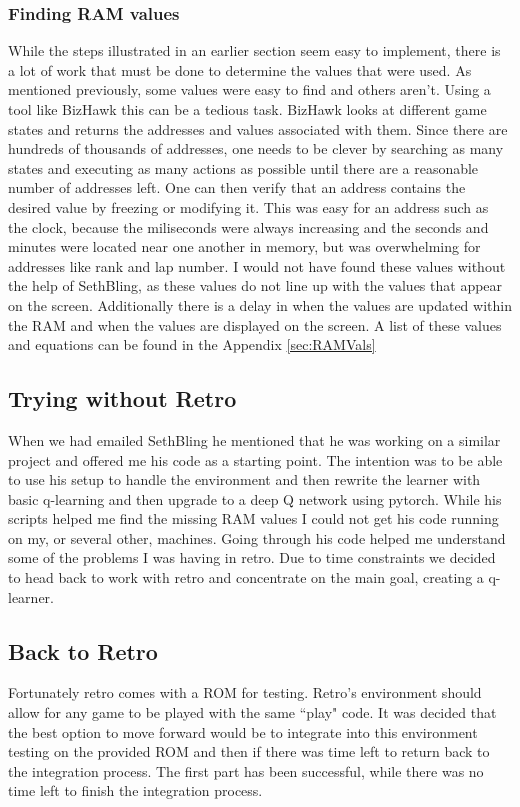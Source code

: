 \subsubsection{Finding RAM values}
\label{sec:RAM}
While the steps illustrated in an earlier section seem easy to implement, 
there is a lot of work that must be done to determine the values that were used. 
As mentioned previously, some values were easy to find and others aren't. 
Using a tool like BizHawk this can be a tedious task. BizHawk looks at different
game states and returns the addresses and values associated with them. Since
there are hundreds of thousands of addresses, one needs to be clever by
searching as many states and executing as many actions as possible until there
are a reasonable number of addresses left. One can then verify that an address
contains the desired value by freezing or modifying it. This was easy for an
address such as the clock, because the miliseconds were always increasing and
the seconds and minutes were located near one another in memory, but was 
overwhelming for addresses like rank and lap number. I would not have found
these values without the help of SethBling, as these values do not line up with
the values that appear on the screen. Additionally there is a delay in when 
the values are updated within the RAM and when the values are displayed on the
screen. A list of these values and equations can be found in the Appendix
\ref{sec:RAMVals}

\subsection{Trying without Retro}
When we had emailed SethBling he mentioned that he was working on a similar 
project and offered me his code as a starting point. The intention was to be able
to use his setup to handle the environment and then rewrite the learner with
basic q-learning and then upgrade to a deep Q network using pytorch. While his
scripts helped me find the missing RAM values I could not get his code running
on my, or several other, machines. Going through his code helped me understand
some of the problems I was having in retro. Due to time constraints we decided
to head back to work with retro and concentrate on the main goal, creating a
q-learner. 

\subsection{Back to Retro}
Fortunately retro comes with a ROM for testing. Retro's environment should allow
for any game to be played with the same ``play" code. It was decided that the
best option to move forward would be to integrate into this environment testing
on the provided ROM and then if there was time left to return back to the 
integration process. The first part has been successful, while there was no
time left to finish the integration process.

